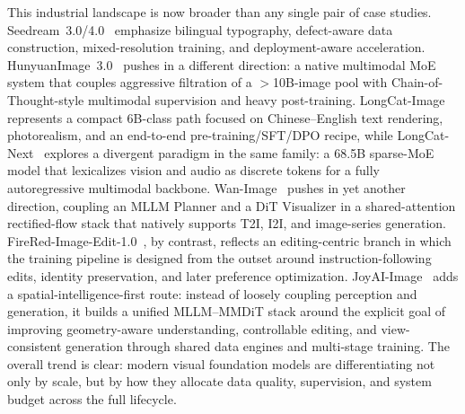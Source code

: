 \documentclass{llmxive}
\begin{document}
This industrial landscape is now broader than any single pair of case studies. Seedream~3.0/4.0~\citep{gao2025seedream,seedream2025seedream} emphasize bilingual typography, defect-aware data construction, mixed-resolution training, and deployment-aware acceleration. HunyuanImage~3.0~\citep{cao2025hunyuanimage} pushes in a different direction: a native multimodal MoE system that couples aggressive filtration of a $>$10B-image pool with Chain-of-Thought-style multimodal supervision and heavy post-training. LongCat-Image~\citep{team2025longcat} represents a compact 6B-class path focused on Chinese--English text rendering, photorealism, and an end-to-end pre-training/SFT/DPO recipe, while LongCat-Next~\citep{team2026longcat} explores a divergent paradigm in the same family: a 68.5B sparse-MoE model that lexicalizes vision and audio as discrete tokens for a fully autoregressive multimodal backbone. Wan-Image~\citep{mao2026wan} pushes in yet another direction, coupling an MLLM Planner and a DiT Visualizer in a shared-attention rectified-flow stack that natively supports T2I, I2I, and image-series generation. FireRed-Image-Edit-1.0~\citep{team2026firered}, by contrast, reflects an editing-centric branch in which the training pipeline is designed from the outset around instruction-following edits, identity preservation, and later preference optimization. JoyAI-Image~\citep{jdjoyaiimage} adds a spatial-intelligence-first route: instead of loosely coupling perception and generation, it builds a unified MLLM--MMDiT stack around the explicit goal of improving geometry-aware understanding, controllable editing, and view-consistent generation through shared data engines and multi-stage training. The overall trend is clear: modern visual foundation models are differentiating not only by scale, but by how they allocate data quality, supervision, and system budget across the full lifecycle.
\end{document}
